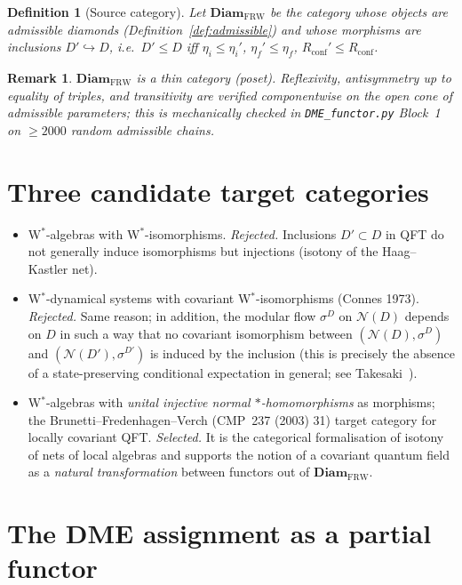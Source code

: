\documentclass[11pt]{article}
\newtheorem{definition}[theorem]{Definition}
\newtheorem{remark}[theorem]{Remark}
\newcommand{\NN}{\mathcal{N}}
\newcommand{\FRW}{{\mathrm{FRW}}}
\newcommand{\Diam}{\mathbf{Diam}_\FRW}
\newcommand{\WCatinj}{\mathbf{W^{*}\!Cat}_{\mathrm{inj}}}
\begin{document}
\begin{definition}[Source category]\label{def:Diam}
Let $\Diam$ be the category whose objects are admissible diamonds
(Definition~\ref{def:admissible}) and whose morphisms are inclusions
$D'\hookrightarrow D$, i.e.\
$D'\le D$ iff
$\eta_i\le\eta_i'$, $\eta_f'\le\eta_f$, $R_{\mathrm{conf}}'\le R_{\mathrm{conf}}$.
\end{definition}

\begin{remark}\label{rem:poset}
$\Diam$ is a thin category (poset). Reflexivity, antisymmetry up to
equality of triples, and transitivity are verified componentwise on
the open cone of admissible parameters; this is mechanically checked
in \texttt{DME\_functor.py} Block~1 on $\ge 2000$ random admissible
chains.
\end{remark}

\section{Three candidate target categories}\label{sec:target}

\begin{itemize}
\item[$\mathbf{Cat_1}$:] W$^*$-algebras with W$^*$-isomorphisms.
\emph{Rejected.} Inclusions $D'\subset D$ in QFT do not generally
induce isomorphisms but injections (isotony of the Haag--Kastler
net).
\item[$\mathbf{Cat_2}$:] W$^*$-dynamical systems with covariant
W$^*$-isomorphisms (Connes 1973). \emph{Rejected.} Same reason; in
addition, the modular flow $\sigma^D$ on $\NN(D)$ depends on $D$ in
such a way that no covariant isomorphism between
$(\NN(D),\sigma^D)$ and $(\NN(D'),\sigma^{D'})$ is induced by the
inclusion (this is precisely the absence of a state-preserving
conditional expectation in general; see Takesaki~\cite{Takesaki1972}).
\item[$\mathbf{Cat_3}\equiv\WCatinj$:] W$^*$-algebras with
\emph{unital injective normal $*$-homomorphisms} as morphisms; the
Brunetti--Fredenhagen--Verch (CMP~237 (2003) 31) target category for
locally covariant QFT. \emph{Selected.} It is the categorical
formalisation of isotony of nets of local algebras and supports the
notion of a covariant quantum field as a \emph{natural transformation}
between functors out of $\Diam$.
\end{itemize}

\section{The DME assignment as a partial functor}\label{sec:functor}
\end{document}
